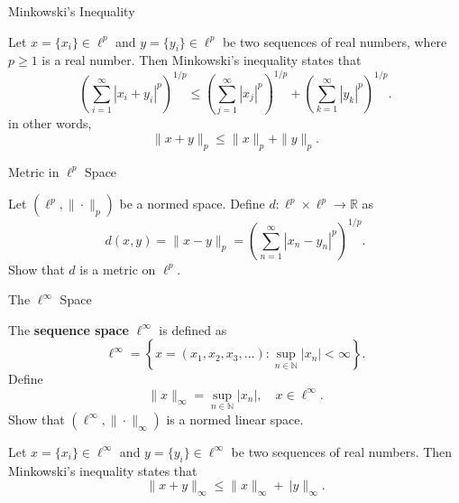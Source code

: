 \documentclass[12pt, a4paper]{article}
\begin{document}
\clearpage

\begin{heading}
    Minkowski's Inequality
\end{heading}

\vspace{10pt}

\begin{theorem}
Let $x=\{x_i\}\in \ell^p$ and $y=\{y_i\}\in \ell^p$ be two sequences of real numbers,
where $p\ge 1$ is a real number. Then Minkowski's inequality states that
\[
\left(\sum_{i=1}^{\infty} |x_i + y_i|^p \right)^{\!1/p}
\le
\left(\sum_{j=1}^{\infty} |x_j|^p \right)^{\!1/p}
+
\left(\sum_{k=1}^{\infty} |y_k|^p \right)^{\!1/p}.
\]
in other words, \[\|x+y\|_p\le \|x\|_p+\|y\|_p.\]
\end{theorem}

\clearpage

\begin{heading}
    Metric in $\ell^p$ Space
\end{heading}

\vspace{10pt}

\begin{theorem}
    Let $(\ell^p,\|\cdot\|_p)$ be a normed space. Define $d:\ell^p\times \ell^p\to\mathbb{R}$ as
    \[
        d(x,y)=\|x-y\|_p=\left(\sum_{n=1}^\infty|x_n-y_n|^p\right)^{\!1/p}.
    \]
    Show that $d$ is a metric on $\ell^p$.
\end{theorem}

\clearpage

\begin{heading}
    The $\ell^\infty$ Space
\end{heading}

\vspace{10pt}

\begin{definition}
    The \textbf{sequence space} $\ell^\infty$ is defined as
    \[
        \ell^\infty=\left\{x=(x_1, x_2, x_3, \dots):\sup_{n\in\mathbb{N}}|x_n|<\infty\right\}.
    \]
    Define \[\|x\|_\infty=\sup_{n\in\mathbb{N}}|x_n|, \quad x\in\ell^\infty.\]
    Show that $(\ell^\infty,\|\cdot\|_\infty)$ is a normed linear space.
\end{definition}

\clearpage

\begin{theorem}
Let $x=\{x_i\}\in \ell^\infty$ and $y=\{y_i\}\in \ell^\infty$ be two sequences of real numbers. Then Minkowski's inequality states that
\[\|x+y\|_\infty\le \|x\|_\infty+\
|y\|_\infty.\]
\end{theorem}
\end{document}

